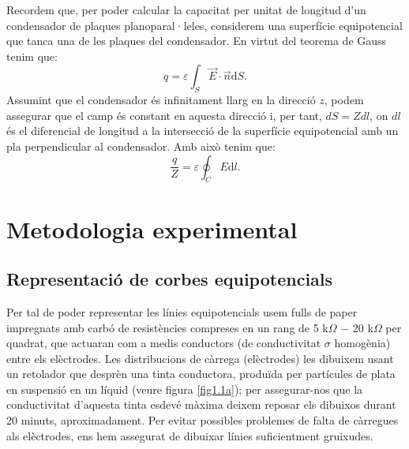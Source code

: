 \documentclass[a4paper,10.5pt]{report}
\begin{document}
Recordem que, per poder calcular la capacitat per unitat de longitud d'un condensador de plaques planoparal·leles, considerem una superfície equipotencial que tanca una de les plaques del condensador. En virtut del teorema de Gauss tenim que:
\begin{equation}
	q = \varepsilon \int_S \vec{E}\cdot \vec{n}\mathrm{d}S.
\end{equation}
Assumint que el condensador és infinitament llarg en la direcció $z$, podem assegurar que el camp és constant en aquesta direcció i, per tant, $dS = Zdl$, on $dl$ és el diferencial de longitud a la intersecció de la superfície equipotencial amb un pla perpendicular al condensador. Amb això tenim que:
\begin{equation}
	\frac{q}{Z} = \varepsilon \oint_C E \mathrm{d}l \label{eq1.13}.
\end{equation}
\section{Metodologia experimental}
\subsection{Representació de corbes equipotencials}
Per tal de poder representar les línies equipotencials usem fulls de paper impregnats amb carbó de resistències compreses en un rang de 5 k$\Omega$ $-$ 20 k$\Omega$ per quadrat, que actuaran com a medis conductors (de conductivitat $\sigma$ homogènia) entre els elèctrodes. Les distribucions de càrrega (elèctrodes) les dibuixem usant un retolador que desprèn una tinta conductora, produïda per partícules de plata en suspensió en un líquid (veure figura \ref{fig1.1a}); per assegurar-nos que la conductivitat d'aquesta tinta esdevé màxima deixem reposar els dibuixos durant 20 minuts, aproximadament. Per evitar possibles problemes de falta de càrregues als elèctrodes, ens hem assegurat de dibuixar línies suficientment gruixudes.
\end{document}
